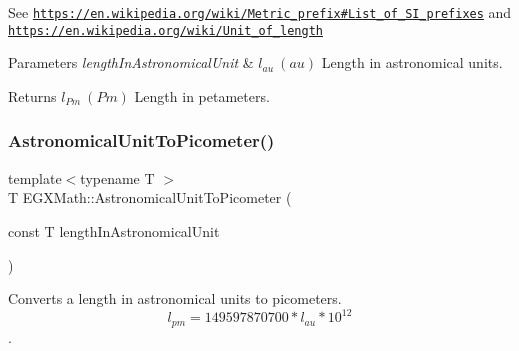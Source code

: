 See \href{https://en.wikipedia.org/wiki/Metric_prefix#List_of_SI_prefixes}{\tt https\+://en.\+wikipedia.\+org/wiki/\+Metric\+\_\+prefix\#\+List\+\_\+of\+\_\+\+S\+I\+\_\+prefixes} and \href{https://en.wikipedia.org/wiki/Unit_of_length}{\tt https\+://en.\+wikipedia.\+org/wiki/\+Unit\+\_\+of\+\_\+length} 
\begin{DoxyParams}{Parameters}
{\em length\+In\+Astronomical\+Unit} & $ l_{au}\ (au)$ Length in astronomical units. \\
\hline
\end{DoxyParams}
\begin{DoxyReturn}{Returns}
$ l_{Pm}\ (Pm)$ Length in petameters. 
\end{DoxyReturn}
\mbox{\label{group___e_g_x_math-_conversions-_length_conversions-_astronomical-_astronomical_unit-_s_i_gaf512b8f1ace4be83fbeb252b447405d6}} 
\subsubsection{\texorpdfstring{Astronomical\+Unit\+To\+Picometer()}{AstronomicalUnitToPicometer()}}
{\footnotesize\ttfamily template$<$typename T $>$ \\
T E\+G\+X\+Math\+::\+Astronomical\+Unit\+To\+Picometer (\begin{DoxyParamCaption}\item[{const T}]{length\+In\+Astronomical\+Unit }\end{DoxyParamCaption})}



Converts a length in astronomical units to picometers. \[ l_{pm}=149597870700 * l_{au} * 10^{12} \]. 

